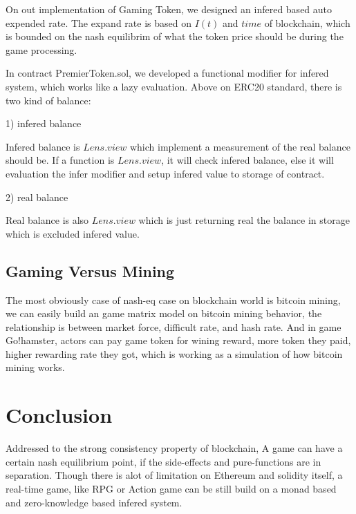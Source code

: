 \documentclass[twocolumn]{article}
\begin{document}
On out implementation of Gaming Token, we designed an infered based auto expended rate. The expand rate is based on $I(t)$ and $time$ of blockchain, which is bounded on the nash equilibrim of what the token price should be during the game processing.

In contract PremierToken.sol, we developed a functional modifier for infered system, which works like a lazy evaluation. Above on ERC20 standard, there is two kind of balance:

1) infered balance

Infered balance is $Lens.view$ which implement a measurement of the real balance should be. If a function is $Lens.view$, it will check infered balance, else it will evaluation the infer modifier and setup infered value to storage of contract.

2) real balance

Real balance is also $Lens.view$ which is just returning real the balance in storage which is excluded infered value.

\subsection {Gaming Versus Mining}

The most obviously case of nash-eq case on blockchain world is bitcoin mining\cite{bitcoin}, we can easily build an game matrix model on bitcoin mining behavior, the relationship is between market force, difficult rate, and hash rate. And in game Go!hamster, actors can pay game token for wining reward, more token they paid, higher rewarding rate they got, which is working as a simulation of how bitcoin mining works.

\section {Conclusion}

Addressed to the strong consistency property of blockchain, A game can have a certain nash equilibrium point, if the side-effects and pure-functions are in separation. Though there is alot of limitation on Ethereum and solidity itself, a real-time game, like RPG or Action game can be still build on a monad based and zero-knowledge based infered system.



\end{document}
